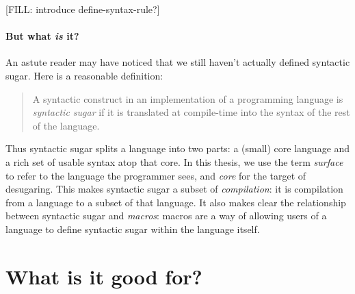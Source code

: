 [FILL: introduce define-syntax-rule?]


\paragraph{But what \emph{is} it?}
An astute reader may have noticed that we still haven't actually
defined syntactic sugar. Here is a reasonable definition:
\begin{quote}
  A syntactic construct in an implementation of a programming language
  is \emph{syntactic sugar} if it is translated at compile-time into
  the syntax of the rest of the language.
\end{quote}
Thus syntactic sugar splits a language into two parts: a (small) core
language and a rich set of usable syntax atop that core. In this
thesis, we use the term \emph{surface} to refer to the language the
programmer sees, and \emph{core} for the target of desugaring.
This makes syntactic sugar a subset of \emph{compilation}: it is
compilation from a language to a subset of that language. It also
makes clear the relationship between syntactic sugar and
\emph{macros}: macros are a way of allowing users of a language to
define syntactic sugar within the language itself.


\section{What is it good for?}

